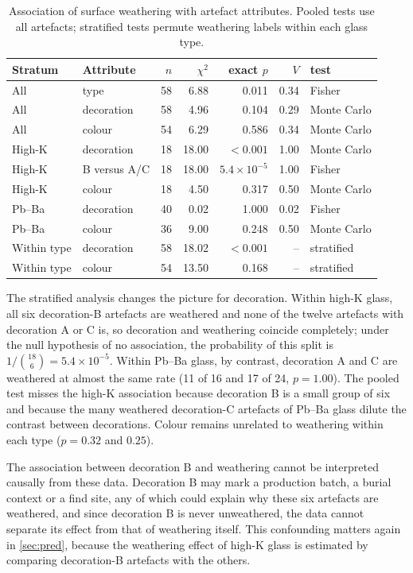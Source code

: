 \documentclass[11pt,a4paper]{article}
\begin{document}
\begin{table}[ht]
\centering
\caption{Association of surface weathering with artefact attributes. Pooled tests use all artefacts; stratified tests permute weathering labels within each glass type.}\label{tab:assoc}
\small
\begin{tabular}{llrrrrl}
\toprule
Stratum & Attribute & $n$ & $\chi^2$ & exact $p$ & $V$ & test \\
\midrule
All & type & 58 & 6.88 & 0.011 & 0.34 & Fisher \\
All & decoration & 58 & 4.96 & 0.104 & 0.29 & Monte Carlo \\
All & colour & 54 & 6.29 & 0.586 & 0.34 & Monte Carlo \\
\addlinespace
High-K & decoration & 18 & 18.00 & $<0.001$ & 1.00 & Monte Carlo \\
High-K & B versus A/C & 18 & 18.00 & $5.4\times10^{-5}$ & 1.00 & Fisher \\
High-K & colour & 18 & 4.50 & 0.317 & 0.50 & Monte Carlo \\
Pb--Ba & decoration & 40 & 0.02 & 1.000 & 0.02 & Fisher \\
Pb--Ba & colour & 36 & 9.00 & 0.248 & 0.50 & Monte Carlo \\
\addlinespace
Within type & decoration & 58 & 18.02 & $<0.001$ & -- & stratified \\
Within type & colour & 54 & 13.50 & 0.168 & -- & stratified \\
\bottomrule
\end{tabular}
\end{table}

The stratified analysis changes the picture for decoration.
Within high-K glass, all six decoration-B artefacts are weathered and none of the twelve artefacts with decoration A or C is, so decoration and weathering coincide completely; under the null hypothesis of no association, the probability of this split is $1/\binom{18}{6}=5.4\times10^{-5}$.
Within Pb--Ba glass, by contrast, decoration A and C are weathered at almost the same rate (11 of 16 and 17 of 24, $p=1.00$).
The pooled test misses the high-K association because decoration B is a small group of six and because the many weathered decoration-C artefacts of Pb--Ba glass dilute the contrast between decorations.
Colour remains unrelated to weathering within each type ($p=0.32$ and $0.25$).

The association between decoration B and weathering cannot be interpreted causally from these data.
Decoration B may mark a production batch, a burial context or a find site, any of which could explain why these six artefacts are weathered, and since decoration B is never unweathered, the data cannot separate its effect from that of weathering itself.
This confounding matters again in \cref{sec:pred}, because the weathering effect of high-K glass is estimated by comparing decoration-B artefacts with the others.
\end{document}
